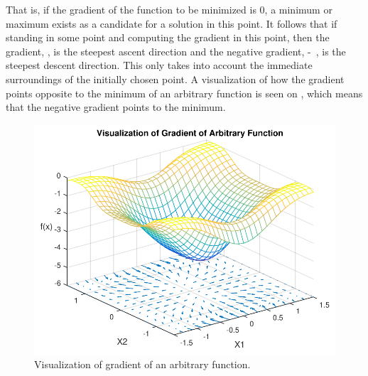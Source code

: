 That is, if the gradient of the function to be minimized is 0, a minimum or maximum exists as a candidate for a solution in this point. It follows that if standing in some point and computing the gradient in this point, then the gradient, \si{}, is the steepest ascent direction and the negative gradient, \si{-}, is the steepest descent direction. This only takes into account the immediate surroundings of the initially chosen point. A visualization of how the gradient points opposite to the minimum of an arbitrary function is seen on , which means that the negative gradient points to the minimum.


\begin{figure}[H] 
	\centering
	\includegraphics[width=.7\textwidth]{figures/visualizationOfGradient}
	\caption{Visualization of gradient of an arbitrary function.}
	\label{visualizationOfGradient}
\end{figure}

